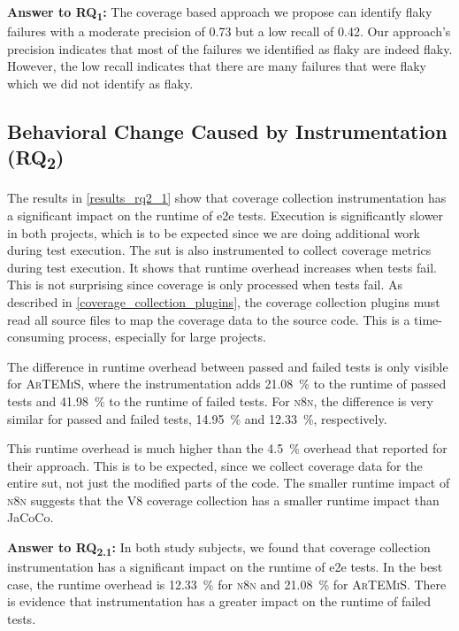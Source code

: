 \begin{mdframed}
	\textbf{Answer to RQ\textsubscript{1}:} The coverage based approach we propose can identify flaky failures with a moderate precision of \num{0.73} but a low recall of \num{0.42}.
	Our approach's precision indicates that most of the failures we identified as flaky are indeed flaky.
	However, the low recall indicates that there are many failures that were flaky which we did not identify as flaky.
\end{mdframed}

\subsection{Behavioral Change Caused by Instrumentation (\texorpdfstring{RQ\textsubscript{2}}{RQ2})}

The results in \cref{results_rq2_1} show that coverage collection instrumentation has a significant impact on the runtime of \ac{e2e} tests.
Execution is significantly slower in both projects, which is to be expected since we are doing additional work during test execution.
The \ac{sut} is also instrumented to collect coverage metrics during test execution.
It shows that runtime overhead increases when tests fail.
This is not surprising since coverage is only processed when tests fail.
As described in \cref{coverage_collection_plugins}, the coverage collection plugins must read all source files to map the coverage data to the source code.
This is a time-consuming process, especially for large projects.

The difference in runtime overhead between passed and failed tests is only visible for \textsc{ArTEMiS}, where the instrumentation adds \SI{21.08}{\percent} to the runtime of passed tests and \SI{41.98}{\percent} to the runtime of failed tests.
For \textsc{n8n}, the difference is very similar for passed and failed tests, \SI{14.95}{\percent} and \SI{12.33}{\percent}, respectively.

This runtime overhead is much higher than the \SI{4.5}{\percent} overhead that \citeauthor*{bell_deflaker_2018} reported for their approach.
This is to be expected, since we collect coverage data for the entire \ac{sut}, not just the modified parts of the code.
The smaller runtime impact of \textsc{n8n} suggests that the V8 coverage collection has a smaller runtime impact than JaCoCo.

\begin{mdframed}
	\textbf{Answer to RQ\textsubscript{2.1}:} In both study subjects, we found that coverage collection instrumentation has a significant impact on the runtime of \ac{e2e} tests.
	In the best case, the runtime overhead is \SI{12.33}{\percent} for \textsc{n8n} and \SI{21.08}{\percent} for \textsc{ArTEMiS}.
	There is evidence that instrumentation has a greater impact on the runtime of failed tests.
\end{mdframed}

